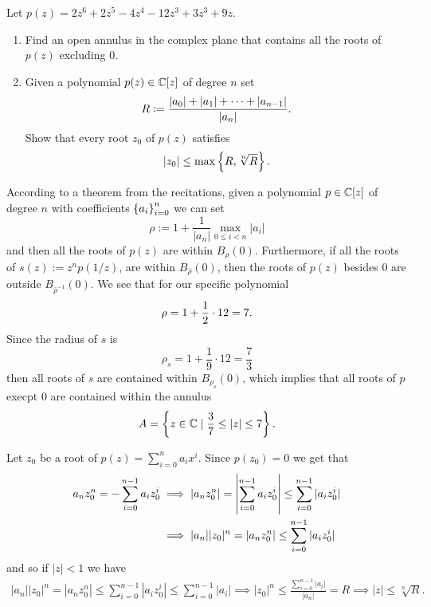 \documentclass[11pt, a4paper]{article}
\begin{document}
\begin{exercise}
  Let $p(z) = 2 z^6 + 2 z^5 - 4 z^4 - 12 z^3 + 3 z^3 + 9 z$.
  \begin{enumerate}
    \item[(1)] Find an open annulus in the complex plane that contains all the
      roots of $p(z)$ excluding $0$.
    \item[(2)] Given a polynomial $p(z) \in \mathbb{C}[z]$ of degree $n$ set
      \[
        R := \frac{\left\lvert a_0\right\rvert + \left\lvert a_1\right\rvert + \cdots + \left\lvert a_{n-1}\right\rvert}{\left\lvert a_n\right\rvert}.
      \]
      Show that every root $z_0$ of $p(z)$ satisfies
      \[
        \left\lvert z_0\right\rvert \le \max\left\{R,\sqrt[n]{R}\right\}.
      \]
  \end{enumerate}
\end{exercise}
\begin{solution} \phantom{}
  \item[(1)] According to a theorem from the recitations,
    given a polynomial $p \in \mathbb{C}[z]$ of degree $n$ with coefficients
    $\left\{a_i\right\}_{i=0}^{n}$ we can set 
    \[
      \rho := 1 + \frac{1}{|a_n|} \max_{0 \le i < n} |a_i|
    \]
    and then all the roots of $p(z)$ are within $B_{\rho}(0)$.
    Furthermore, if all the roots of $s(z) := z^n p(1/ z)$,
    are within $B_{\bar \rho}(0)$,
    then the roots of $p(z)$ besides $0$ are outside $B_{\bar \rho^{-1}}(0)$.
    We see that for our specific polynomial
    \[
      \rho = 1 + \frac{1}{2} \cdot 12 = 7.
    \]
    Since the radius of $s$ is
    \[
      \rho_s = 1 + \frac{1}{9} \cdot 12 = \frac{7}{3}
    \]
    then all roots of $s$ are contained within $B_{\rho_s}(0)$,
    which implies that all roots of $p$ execpt $0$ are contained within the
    annulus
    \[
      A = \left\{z \in \mathbb{C} \mid \frac{3}{7} \leq |z| \leq 7\right\}.
    \]
  \item[(2)] 
  Let $z_0$ be a root of $p(z) = \sum_{i=0}^{n} a_i x^i$.
  Since $p(z_0) = 0$ we get that
  \begin{align*}
    a_n z_0^n = - \sum_{i=0}^{n-1} a_i z_0^i &\implies
    |a_n z_0^n| =
    \left\lvert\sum_{i=0}^{n-1} a_iz_0^i\right\rvert \leq
    \sum_{i=0}^{n-1} |a_iz_0^i| \\
    &\implies
    |a_n| |z_0|^n =
    |a_n z_0^n| \leq
    \sum_{i=0}^{n-1} |a_i z_0^i|
  \end{align*}
  and so if $|z| < 1$ we have
  \begin{align*}
    |a_n| |z_0|^n =
    |a_n z_0^n| \leq
    \sum_{i=0}^{n-1} |a_i z_0^i| \leq
    \sum_{i=0}^{n-1} |a_i|
    \implies
    |z_0|^n \leq \frac{\sum_{i=0}^{n-1}|a_i|}{|a_n|} = R
    \implies
    |z| \leq \sqrt[n]{R}.

\end{align*}
\end{solution}
\end{document}
